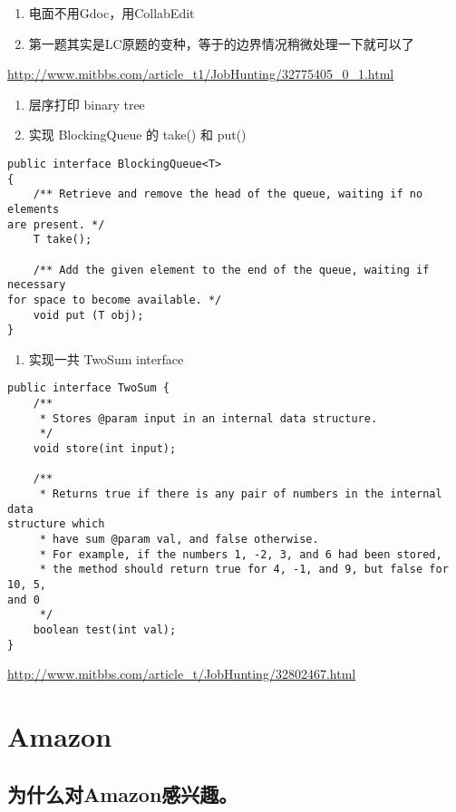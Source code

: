 \documentclass[12pt]{book}
\begin{document}
\begin{enumerate}
\item 电面不用Gdoc，用CollabEdit

\item 第一题其实是LC原题的变种，等于的边界情况稍微处理一下就可以了
\end{enumerate}

\url{http://www.mitbbs.com/article_t1/JobHunting/32775405_0_1.html}

\begin{enumerate}
\item 层序打印 binary tree

\item 实现 BlockingQueue 的 take() 和 put()
\end{enumerate}
\lstset{language=java,label= ,caption= ,numbers=none}
\begin{lstlisting}
public interface BlockingQueue<T>
{
    /** Retrieve and remove the head of the queue, waiting if no elements 
are present. */
    T take();

    /** Add the given element to the end of the queue, waiting if necessary 
for space to become available. */
    void put (T obj);
}
\end{lstlisting}

\begin{enumerate}
\item 实现一共 TwoSum interface
\end{enumerate}
\lstset{language=java,label= ,caption= ,numbers=none}
\begin{lstlisting}
public interface TwoSum {
    /**
     * Stores @param input in an internal data structure.
     */
    void store(int input);

    /**
     * Returns true if there is any pair of numbers in the internal data 
structure which
     * have sum @param val, and false otherwise.
     * For example, if the numbers 1, -2, 3, and 6 had been stored,
     * the method should return true for 4, -1, and 9, but false for 10, 5, 
and 0
     */
    boolean test(int val);
}
\end{lstlisting}
\url{http://www.mitbbs.com/article_t/JobHunting/32802467.html}

\chapter{Amazon}
\label{sec-18}
\section{为什么对Amazon感兴趣。}
\label{sec-18-1}
\end{document}
